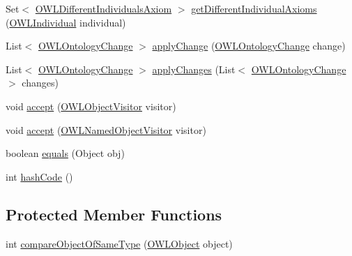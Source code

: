 \begin{DoxyCompactItemize}
Set$<$ \hyperlink{interfaceorg_1_1semanticweb_1_1owlapi_1_1model_1_1_o_w_l_different_individuals_axiom}{O\-W\-L\-Different\-Individuals\-Axiom} $>$ \hyperlink{classuk_1_1ac_1_1manchester_1_1cs_1_1owl_1_1owlapi_1_1_o_w_l_ontology_impl_aee20588109e7d8b68b8604ca6a34da68}{get\-Different\-Individual\-Axioms} (\hyperlink{interfaceorg_1_1semanticweb_1_1owlapi_1_1model_1_1_o_w_l_individual}{O\-W\-L\-Individual} individual)
\item 
List$<$ \hyperlink{classorg_1_1semanticweb_1_1owlapi_1_1model_1_1_o_w_l_ontology_change}{O\-W\-L\-Ontology\-Change} $>$ \hyperlink{classuk_1_1ac_1_1manchester_1_1cs_1_1owl_1_1owlapi_1_1_o_w_l_ontology_impl_a1020453f1d3d4c4561a0c16c6ffdc2ad}{apply\-Change} (\hyperlink{classorg_1_1semanticweb_1_1owlapi_1_1model_1_1_o_w_l_ontology_change}{O\-W\-L\-Ontology\-Change} change)
\item 
List$<$ \hyperlink{classorg_1_1semanticweb_1_1owlapi_1_1model_1_1_o_w_l_ontology_change}{O\-W\-L\-Ontology\-Change} $>$ \hyperlink{classuk_1_1ac_1_1manchester_1_1cs_1_1owl_1_1owlapi_1_1_o_w_l_ontology_impl_a869610d693587b458943310857e63336}{apply\-Changes} (List$<$ \hyperlink{classorg_1_1semanticweb_1_1owlapi_1_1model_1_1_o_w_l_ontology_change}{O\-W\-L\-Ontology\-Change} $>$ changes)
\item 
void \hyperlink{classuk_1_1ac_1_1manchester_1_1cs_1_1owl_1_1owlapi_1_1_o_w_l_ontology_impl_af79d2845e304ca40fdcff8c0372a498c}{accept} (\hyperlink{interfaceorg_1_1semanticweb_1_1owlapi_1_1model_1_1_o_w_l_object_visitor}{O\-W\-L\-Object\-Visitor} visitor)
\item 
void \hyperlink{classuk_1_1ac_1_1manchester_1_1cs_1_1owl_1_1owlapi_1_1_o_w_l_ontology_impl_a62afc94ff1286c7e456e1a26a1399344}{accept} (\hyperlink{interfaceorg_1_1semanticweb_1_1owlapi_1_1model_1_1_o_w_l_named_object_visitor}{O\-W\-L\-Named\-Object\-Visitor} visitor)
\item 
boolean \hyperlink{classuk_1_1ac_1_1manchester_1_1cs_1_1owl_1_1owlapi_1_1_o_w_l_ontology_impl_a683fa9f1946b4b6699586237d2fd936f}{equals} (Object obj)
\item 
int \hyperlink{classuk_1_1ac_1_1manchester_1_1cs_1_1owl_1_1owlapi_1_1_o_w_l_ontology_impl_af60227ba8c3ddc8ab72064f5cd6b6d83}{hash\-Code} ()
\end{DoxyCompactItemize}
\subsection*{Protected Member Functions}
\begin{DoxyCompactItemize}
\item 
int \hyperlink{classuk_1_1ac_1_1manchester_1_1cs_1_1owl_1_1owlapi_1_1_o_w_l_ontology_impl_a229fb9cd74d2d30a7fcab4a963909de3}{compare\-Object\-Of\-Same\-Type} (\hyperlink{interfaceorg_1_1semanticweb_1_1owlapi_1_1model_1_1_o_w_l_object}{O\-W\-L\-Object} object)
\end{DoxyCompactItemize}
